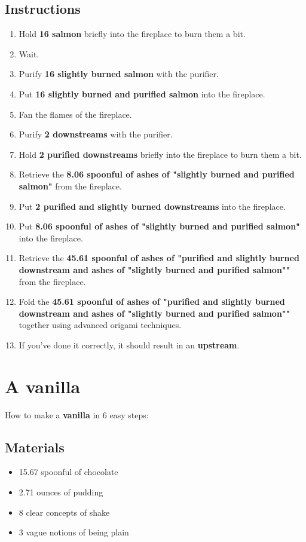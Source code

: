 \documentclass{article}
\begin{document}
\subsection{Instructions}\begin{enumerate}
\item 
Hold \textbf{16 salmon} briefly into the fireplace to burn them a bit.
\item 
Wait.
\item 
Purify \textbf{16 slightly burned salmon} with the purifier.
\item 
Put \textbf{16 slightly burned and purified salmon} into the fireplace.
\item 
Fan the flames of the fireplace.
\item 
Purify \textbf{2 downstreams} with the purifier.
\item 
Hold \textbf{2 purified downstreams} briefly into the fireplace to burn them a bit.
\item 
Retrieve the \textbf{8.06 spoonful of ashes of "slightly burned and purified salmon"} from the fireplace.
\item 
Put \textbf{2 purified and slightly burned downstreams} into the fireplace.
\item 
Put \textbf{8.06 spoonful of ashes of "slightly burned and purified salmon"} into the fireplace.
\item 
Retrieve the \textbf{45.61 spoonful of ashes of "purified and slightly burned downstream and ashes of "slightly burned and purified salmon""} from the fireplace.
\item 
Fold the \textbf{45.61 spoonful of ashes of "purified and slightly burned downstream and ashes of "slightly burned and purified salmon""} together using advanced origami techniques.
\item 
If you've done it correctly, it should result in an \textbf{upstream}.
\end{enumerate}
\newpage
\section{A vanilla}How to make a \textbf{vanilla} in 6 easy steps:

\subsection{Materials}\begin{itemize}
\item 
15.67 spoonful of chocolate
\item 
2.71 ounces of pudding
\item 
8 clear concepts of shake
\item 
3 vague notions of being plain
\end{itemize}
\end{document}
